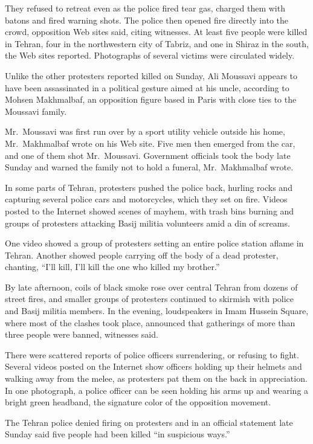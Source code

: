 ﻿\documentclass[12pt]{article}
\begin{document}
They refused to retreat even as the police fired tear gas, charged them with batons and fired
warning shots. The police then opened fire directly into the crowd, opposition Web sites said,
citing witnesses. At least five people were killed in Tehran, four in the northwestern city of
Tabriz, and one in Shiraz in the south, the Web sites reported. Photographs of several victims were
circulated widely.

Unlike the other protesters reported killed on Sunday, Ali Moussavi appears to have been
assassinated in a political gesture aimed at his uncle, according to Mohsen Makhmalbaf, an
opposition figure based in Paris with close ties to the Moussavi family.

Mr.~Moussavi was first run over by a sport utility vehicle outside his home, Mr.~Makhmalbaf wrote on
his Web site. Five men then emerged from the car, and one of them shot Mr.~Moussavi. Government
officials took the body late Sunday and warned the family not to hold a funeral, Mr.~Makhmalbaf
wrote.

In some parts of Tehran, protesters pushed the police back, hurling rocks and capturing several
police cars and motorcycles, which they set on fire. Videos posted to the Internet showed scenes of
mayhem, with trash bins burning and groups of protesters attacking Basij militia volunteers amid a
din of screams.

One video showed a group of protesters setting an entire police station aflame in Tehran. Another
showed people carrying off the body of a dead protester, chanting, ``I'll kill, I'll kill the one
who killed my brother.''

By late afternoon, coils of black smoke rose over central Tehran from dozens of street fires, and
smaller groups of protesters continued to skirmish with police and Basij militia members. In the
evening, loudspeakers in Imam Hussein Square, where most of the clashes took place, announced that
gatherings of more than three people were banned, witnesses said.

There were scattered reports of police officers surrendering, or refusing to fight. Several videos
posted on the Internet show officers holding up their helmets and walking away from the melee, as
protesters pat them on the back in appreciation. In one photograph, a police officer can be seen
holding his arms up and wearing a bright green headband, the signature color of the opposition
movement.

The Tehran police denied firing on protesters and in an official statement late Sunday said five
people had been killed ``in suspicious ways.''
\end{document}
